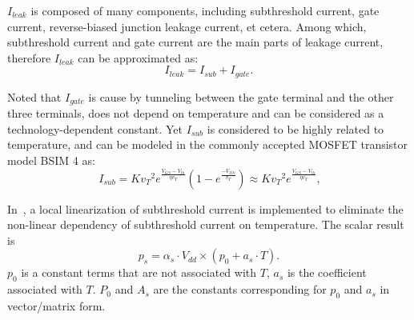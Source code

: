 $I_{leak}$ is composed of many components, including subthreshold current, gate current, reverse-biased junction leakage current, et cetera. Among which, subthreshold current and gate current are the main parts of leakage current, therefore $I_{leak}$ can be approximated as:
\begin{equation}\label{eq:leakage}
I_{leak}=I_{sub}+I_{gate}.
\end{equation}

Noted that $I_{gate}$ is cause by tunneling between the gate terminal and the other three terminals, does not depend on temperature and can be considered as a technology-dependent constant. Yet $I_{sub}$ is considered to be highly related to temperature, and can be modeled in the commonly accepted MOSFET transistor model BSIM 4 as:
\begin{equation}\label{eq:sub_current}\
I_{sub}=K {v_T}^2e^{\frac{V_{GS}-V_{th}}{\eta v_T}}
  (1-e^{\frac{-V_{DS}}{v_T}}) \approx K {v_T}^2e^{\frac{V_{GS}-V_{th}}{\eta v_T}},
\end{equation}

In~\cite{WangWan:TOC'18}, a local linearization of subthreshold current is implemented to eliminate the non-linear dependency of subthreshold current on temperature. The scalar result is
\begin{equation}\label{eq:lin_leakage}
p_{s} = \alpha_{s}\cdot V_{dd} \times (p_{0}+a_{s} \cdot T).
\end{equation}
$p_{0}$ is a constant terms that are not associated with $T$, $a_{s}$ is the coefficient associated with $T$. $P_{0}$ and $A_{s}$ are the constants corresponding for $p_{0}$ and $a_{s}$ in vector/matrix form.



